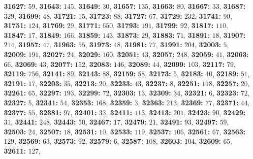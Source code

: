 \textsf{\bfseries 31627:} $59$, \textsf{\bfseries 31643:} $145$, \textsf{\bfseries 31649:} $30$, \textsf{\bfseries 31657:} $135$, \textsf{\bfseries 31663:} $80$, \textsf{\bfseries 31667:} $33$, \textsf{\bfseries 31687:} $329$, \textsf{\bfseries 31699:} $48$, \textsf{\bfseries 31721:} $15$, \textsf{\bfseries 31723:} $88$, \textsf{\bfseries 31727:} $67$, \textsf{\bfseries 31729:} $232$, \textsf{\bfseries 31741:} $90$, \textsf{\bfseries 31751:} $124$, \textsf{\bfseries 31769:} $29$, \textsf{\bfseries 31771:} $650$, \textsf{\bfseries 31793:} $191$, \textsf{\bfseries 31799:} $92$, \textsf{\bfseries 31817:} $110$, \textsf{\bfseries 31847:} $17$, \textsf{\bfseries 31849:} $166$, \textsf{\bfseries 31859:} $143$, \textsf{\bfseries 31873:} $29$, \textsf{\bfseries 31883:} $71$, \textsf{\bfseries 31891:} $18$, \textsf{\bfseries 31907:} $214$, \textsf{\bfseries 31957:} $47$, \textsf{\bfseries 31963:} $55$, \textsf{\bfseries 31973:} $48$, \textsf{\bfseries 31981:} $77$, \textsf{\bfseries 31991:} $204$, \textsf{\bfseries 32003:} $5$, \textsf{\bfseries 32009:} $191$, \textsf{\bfseries 32027:} $24$, \textsf{\bfseries 32029:} $160$, \textsf{\bfseries 32051:} $43$, \textsf{\bfseries 32057:} $248$, \textsf{\bfseries 32059:} $41$, \textsf{\bfseries 32063:} $66$, \textsf{\bfseries 32069:} $43$, \textsf{\bfseries 32077:} $152$, \textsf{\bfseries 32083:} $146$, \textsf{\bfseries 32089:} $44$, \textsf{\bfseries 32099:} $103$, \textsf{\bfseries 32117:} $79$, \textsf{\bfseries 32119:} $756$, \textsf{\bfseries 32141:} $89$, \textsf{\bfseries 32143:} $88$, \textsf{\bfseries 32159:} $58$, \textsf{\bfseries 32173:} $5$, \textsf{\bfseries 32183:} $40$, \textsf{\bfseries 32189:} $51$, \textsf{\bfseries 32191:} $17$, \textsf{\bfseries 32203:} $35$, \textsf{\bfseries 32213:} $20$, \textsf{\bfseries 32233:} $43$, \textsf{\bfseries 32237:} $8$, \textsf{\bfseries 32251:} $118$, \textsf{\bfseries 32257:} $20$, \textsf{\bfseries 32261:} $65$, \textsf{\bfseries 32297:} $193$, \textsf{\bfseries 32299:} $72$, \textsf{\bfseries 32303:} $13$, \textsf{\bfseries 32309:} $34$, \textsf{\bfseries 32321:} $6$, \textsf{\bfseries 32323:} $72$, \textsf{\bfseries 32327:} $5$, \textsf{\bfseries 32341:} $54$, \textsf{\bfseries 32353:} $168$, \textsf{\bfseries 32359:} $3$, \textsf{\bfseries 32363:} $213$, \textsf{\bfseries 32369:} $77$, \textsf{\bfseries 32371:} $44$, \textsf{\bfseries 32377:} $55$, \textsf{\bfseries 32381:} $97$, \textsf{\bfseries 32401:} $33$, \textsf{\bfseries 32411:} $113$, \textsf{\bfseries 32413:} $201$, \textsf{\bfseries 32423:} $90$, \textsf{\bfseries 32429:} $31$, \textsf{\bfseries 32441:} $248$, \textsf{\bfseries 32443:} $50$, \textsf{\bfseries 32467:} $17$, \textsf{\bfseries 32479:} $21$, \textsf{\bfseries 32491:} $93$, \textsf{\bfseries 32497:} $59$, \textsf{\bfseries 32503:} $24$, \textsf{\bfseries 32507:} $18$, \textsf{\bfseries 32531:} $10$, \textsf{\bfseries 32533:} $119$, \textsf{\bfseries 32537:} $106$, \textsf{\bfseries 32561:} $67$, \textsf{\bfseries 32563:} $129$, \textsf{\bfseries 32569:} $63$, \textsf{\bfseries 32573:} $92$, \textsf{\bfseries 32579:} $6$, \textsf{\bfseries 32587:} $108$, \textsf{\bfseries 32603:} $104$, \textsf{\bfseries 32609:} $65$, \textsf{\bfseries 32611:} $127$, 
